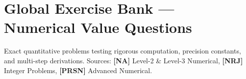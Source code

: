 \chapter*{Global Exercise Bank --- Numerical Value Questions}
\label{chap:numerical_value}

\begin{tcolorbox}[enhanced,colback=subtleblue,colframe=primarynavy,arc=2mm,boxrule=1pt,
    title=\textbf{\large Numerical Value Type Questions (Integer \& Decimal Answers)}]
Exact quantitative problems testing rigorous computation, precision constants, and multi-step derivations.
Sources: \textbf{[NA]} Level-2 \& Level-3 Numerical, \textbf{[NRJ]} Integer Problems, \textbf{[PRSN]} Advanced Numerical.
\end{tcolorbox}

